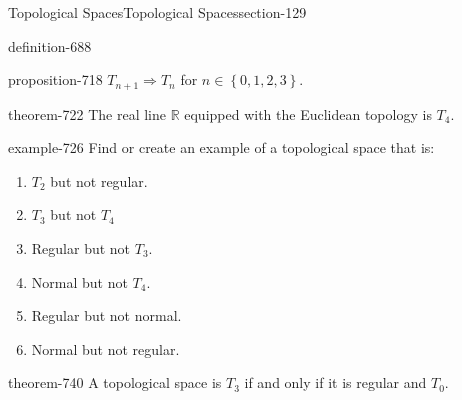 \documentclass[oneside,10pt,]{article}
\newcommand{\mb}{\mathbb}
\newcommand{\setList}[1]{\left\{#1\right\}}
\begin{document}
\begin{sectionptx}{Topological Spaces}{}{Topological Spaces}{}{}{section-129}
\begin{definition}{}{definition-688}
\begin{enumerate}
\end{enumerate}
\end{definition}
\begin{proposition}{}{}{proposition-718}%
\hypertarget{p-719}{}%
\(T_{n+1}\Rightarrow T_n\) for \(n\in\setList{0,1,2,3}\).%
\end{proposition}
\begin{theorem}{}{}{theorem-722}%
\hypertarget{p-723}{}%
The real line \(\mb R\) equipped with the Euclidean topology is \(T_4\).%
\end{theorem}
\begin{example}{}{example-726}%
\hypertarget{p-727}{}%
Find or create an example of a topological space that is:%
\leavevmode%
\begin{enumerate}
\item\hypertarget{li-729}{}\(T_2\) but not regular.%
\item\hypertarget{li-731}{}\(T_3\) but not \(T_4\)%
\item\hypertarget{li-734}{}Regular but not \(T_3\).%
\item\hypertarget{li-736}{}Normal but not \(T_4\).%
\item\hypertarget{li-738}{}Regular but not normal.%
\item\hypertarget{li-739}{}Normal but not regular.%
\end{enumerate}
\end{example}
\begin{theorem}{}{}{theorem-740}%
\hypertarget{p-741}{}%
A topological space is \(T_3\) if and only if it is regular and \(T_0\).%
\end{theorem}
\end{sectionptx}
%
%
\typeout{************************************************}
\typeout{************************************************}
%
\end{document}
